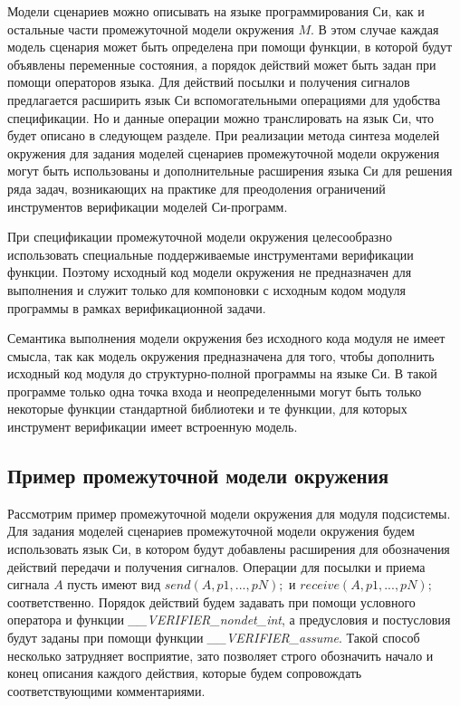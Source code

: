 Модели сценариев можно описывать на языке программирования Си, как и остальные части промежуточной модели окружения $M$.
В этом случае каждая модель сценария может быть определена при помощи функции, в которой будут объявлены переменные состояния, а порядок действий может быть задан при помощи операторов языка.
Для действий посылки и получения сигналов предлагается расширить язык Си вспомогательными операциями для удобства спецификации.
Но и данные операции можно транслировать на язык Си, что будет описано в следующем разделе.
При реализации метода синтеза моделей окружения для задания моделей сценариев промежуточной модели окружения могут быть использованы и дополнительные расширения языка Си для решения ряда задач, возникающих на практике для преодоления ограничений инструментов верификации моделей Си-программ.

При спецификации промежуточной модели окружения целесообразно использовать специальные поддерживаемые инструментами верификации функции.
Поэтому исходный код модели окружения не предназначен для выполнения и служит только для компоновки с исходным кодом модуля программы в рамках верификационной задачи.

Семантика выполнения модели окружения без исходного кода модуля не имеет смысла, так как модель окружения предназначена для того, чтобы дополнить исходный код модуля до структурно-полной программы на языке Си.
В такой программе только одна точка входа и неопределенными могут быть только некоторые функции стандартной библиотеки и те функции, для которых инструмент верификации имеет встроенную модель.

\subsection{Пример промежуточной модели окружения}
Рассмотрим пример промежуточной модели окружения для модуля подсистемы.
Для задания моделей сценариев промежуточной модели окружения будем использовать язык Си, в котором будут добавлены расширения для обозначения действий передачи и получения сигналов.
Операции для посылки и приема сигнала $A$ пусть имеют вид $send(A, p1, ..., pN);$ и \break $receive(A, p1, ..., pN);$ соответственно.
Порядок действий будем задавать при помощи условного оператора и функции \textit{\_\_VERIFIER\_nondet\_int}, а предусловия и постусловия будут заданы при помощи функции \textit{\_\_VERIFIER\_assume}.
Такой способ несколько затрудняет восприятие, зато позволяет строго обозначить начало и конец описания каждого действия, которые будем сопровождать соответствующими комментариями.

